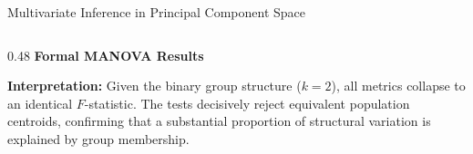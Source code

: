\documentclass[8pt, aspectratio=169]{beamer}
\begin{document}
\begin{frame}{Multivariate Inference in Principal Component Space}
    \begin{columns}[T]
        \begin{column}{0.48\textwidth}
            \centering
            \textbf{Formal MANOVA Results}
            \vspace{0.1cm}
            \begin{table}
            \end{table}
            \vspace{0.1cm}
            \justifying
            \scriptsize{\textbf{Interpretation:} Given the binary group structure ($k=2$), all metrics collapse to an identical $F$-statistic. The tests decisively reject equivalent population centroids, confirming that a substantial proportion of structural variation is explained by group membership.}
        \end{column}
        

\end{columns}
\end{frame}
\end{document}

